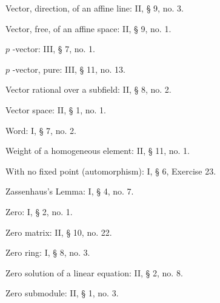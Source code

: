 Vector, direction, of an affine line: II, § 9, no. 3.

Vector, free, of an affine space: II, § 9, no. 1.

\(p\) -vector: III, § 7, no. 1.

\(p\) -vector, pure: III, § 11, no. 13.

Vector rational over a subfield: II, § 8, no. 2.

Vector space: II, § 1, no. 1.

Word: I, § 7, no. 2.

Weight of a homogeneous element: II, § 11, no. 1.

With no fixed point (automorphism): I, § 6, Exercise 23.

Zassenhaus's Lemma: I, § 4, no. 7.

Zero: I, § 2, no. 1.

Zero matrix: II, § 10, no. 22.

Zero ring: I, § 8, no. 3.

Zero solution of a linear equation: II, § 2, no. 8.

Zero submodule: II, § 1, no. 3.
